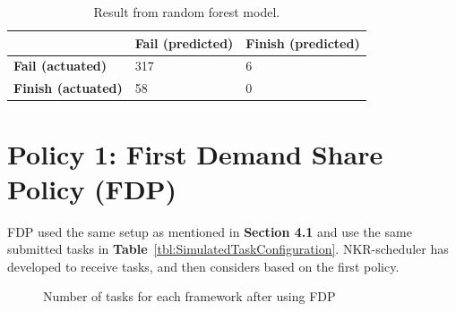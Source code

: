 \documentclass[12pt,oneside,openright,a4paper]{cpe-english-project}
\begin{document}
\begin{table}[!h]
  \caption{Result from random forest model.}\label{tbl:RandomForestConfusion}
  \begin{tabular}{@{}|p{}|p{}|p{}|}
   \hline
   \textbf{} & \textbf{Fail (predicted)} & \textbf{Finish (predicted)} \\ 
   \hline
   \textbf{Fail (actuated)} & 317 & 6 \\ 
   \hline
   \textbf{Finish (actuated)} & 58 & 0 \\ 
   \hline                     
  \end{tabular}
\end{table}

\section{Policy 1: First Demand Share Policy (FDP)}  

\hspace{10mm}FDP used the same setup as mentioned in \textbf{Section 4.1} and use the same submitted tasks in \textbf{Table}~\ref{tbl:SimulatedTaskConfiguration}. NKR-scheduler has developed to receive tasks, and then considers based on the first policy. 

\begin{figure}[!h]\centering
    \setlength{\fboxrule}{0mm} %
    \setlength{\fboxsep}{0cm}
    \caption{Number of tasks for each framework after using FDP}\label{fig:task1}
\end{figure}
\end{document}

